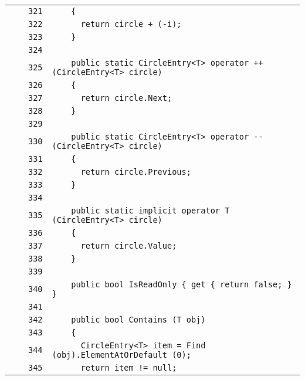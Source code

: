 \documentclass[a4paper,10pt]{article}
\begin{document}
\begin{longtable}[l]{lrrl}
\cellcolor{gray} &  & \verb~321~ & \verb~    {~\\
\cellcolor{gray} &  & \verb~322~ & \verb~      return circle + (-i);~\\
\cellcolor{gray} &  & \verb~323~ & \verb~    }~\\
\cellcolor{gray} &  & \verb~324~ & \verb~~\\
\cellcolor{gray} &  & \verb~325~ & \verb~    public static CircleEntry<T> operator ++ (CircleEntry<T> circle)~\\
\cellcolor{gray} &  & \verb~326~ & \verb~    {~\\
\cellcolor{gray} &  & \verb~327~ & \verb~      return circle.Next;~\\
\cellcolor{gray} &  & \verb~328~ & \verb~    }~\\
\cellcolor{gray} &  & \verb~329~ & \verb~~\\
\cellcolor{gray} &  & \verb~330~ & \verb~    public static CircleEntry<T> operator -- (CircleEntry<T> circle)~\\
\cellcolor{gray} &  & \verb~331~ & \verb~    {~\\
\cellcolor{gray} &  & \verb~332~ & \verb~      return circle.Previous;~\\
\cellcolor{gray} &  & \verb~333~ & \verb~    }~\\
\cellcolor{gray} &  & \verb~334~ & \verb~~\\
\cellcolor{gray} &  & \verb~335~ & \verb~    public static implicit operator T (CircleEntry<T> circle)~\\
\cellcolor{gray} &  & \verb~336~ & \verb~    {~\\
\cellcolor{gray} &  & \verb~337~ & \verb~      return circle.Value;~\\
\cellcolor{gray} &  & \verb~338~ & \verb~    }~\\
\cellcolor{gray} &  & \verb~339~ & \verb~~\\
\cellcolor{gray} &  & \verb~340~ & \verb~    public bool IsReadOnly { get { return false; } }~\\
\cellcolor{gray} &  & \verb~341~ & \verb~~\\
\cellcolor{gray} &  & \verb~342~ & \verb~    public bool Contains (T obj)~\\
\cellcolor{gray} &  & \verb~343~ & \verb~    {~\\
\cellcolor{gray} &  & \verb~344~ & \verb~      CircleEntry<T> item = Find (obj).ElementAtOrDefault (0);~\\
\cellcolor{gray} &  & \verb~345~ & \verb~      return item != null;~\\

\end{longtable}
\end{document}
